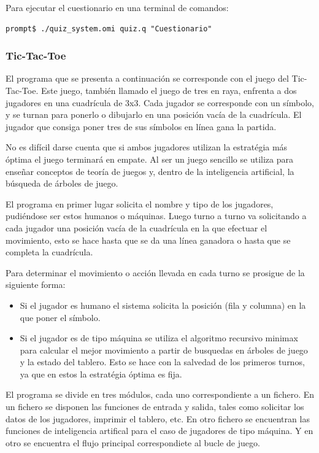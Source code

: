 Para ejecutar el cuestionario en una terminal de comandos:

\begin{lstlisting}
prompt$ ./quiz_system.omi quiz.q "Cuestionario"
\end{lstlisting}

\subsubsection {Tic-Tac-Toe}
El programa que se presenta a continuación se corresponde con el juego del Tic-Tac-Toe. Este juego, también llamado 
el juego de tres en raya, enfrenta a dos jugadores en una cuadrícula de 3x3. Cada jugador se corresponde con un símbolo, y
se turnan para ponerlo o dibujarlo en una posición vacía de la cuadrícula. El jugador que consiga poner tres de sus símbolos en línea
gana la partida. 

No es difícil darse cuenta que si ambos jugadores utilizan la estratégia más óptima el juego terminará en empate. Al ser un juego sencillo se 
utiliza para enseñar conceptos de teoría de juegos y, dentro de la inteligencia artificial, la búsqueda de árboles de juego.

El programa en primer lugar solicita el nombre y tipo de los jugadores, pudiéndose ser estos humanos o máquinas. Luego turno a turno va solicitando 
a cada jugador una posición vacía de la cuadrícula en la que efectuar el movimiento, esto se hace hasta que se da una línea ganadora o hasta que se
completa la cuadrícula. 

Para determinar el movimiento o acción llevada en cada turno se prosigue de la siguiente forma:
\begin{itemize} 
\item Si el jugador es humano el sistema solicita la posición (fila y columna) en la que poner el símbolo. 
\item Si el jugador es de tipo máquina se utiliza el algoritmo recursivo minimax para calcular el mejor 
movimiento a partir de busquedas en árboles de juego y la estado del tablero. Esto se hace con la salvedad de los primeros turnos, ya 
que en estos la estratégia óptima es fija.
\end{itemize}

El programa se divide en tres módulos, cada uno correspondiente a un fichero. En un fichero se disponen las funciones de entrada y salida, tales como
solicitar los datos de los jugadores, imprimir el tablero, etc. En otro fichero se encuentran las funciones de inteligencia artifical para el caso de 
jugadores de tipo máquina. Y en otro se encuentra el flujo principal correspondiete al bucle de juego.

